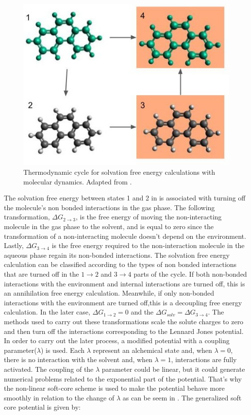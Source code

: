 	\begin{figure}[th]
		\centering
		\includegraphics[scale=0.6]{Figures/cicclotermo.jpg}
		\caption{Thermodynamic cycle for solvation free energy calculations with molecular dynamics. Adapted from .}
		\label{thermcy}
	\end{figure}
	
	The solvation free energy between states 1 and 2 in  is associated with turning off the molecule's non bonded interactions in the gas phase. The following transformation, $\Delta G_{2 \rightarrow 3}$, is the free energy of moving the non-interacting molecule in the gas phase to the solvent, and is equal to zero since the transformation of a non-interacting molecule doesn't depend on the environment. Lastly, $\Delta G_{3 \rightarrow 4}$ is the free energy required to the non-interaction molecule in the aqueous phase regain its non-bonded interactions.  The solvation free energy calculation can be classified according to the types of non bonded interactions that are turned off in the $1 \rightarrow 2$ and $ 3 \rightarrow 4$ parts of the cycle. If both non-bonded interactions with the environment and internal interactions are turned off, this is an annihilation free energy calculation. Meanwhile, if only non-bonded interactions with the environment are turned off,this is a decoupling free energy calculation. In the later case, $\Delta G_{1 \rightarrow 2} = 0$ and the $\Delta G_{solv} = \Delta G_{3 \rightarrow 4} $. The methods used to carry out these transformations scale the solute charges to zero and then turn off the interactions corresponding to the Lennard Jones potential. In order to carry out the later process, a modified potential with a coupling parameter($\lambda$) is used. Each $\lambda$ represent an alchemical state and, when $\lambda=0$, there is no interaction with the solvent and, when $\lambda=1$, interactions are fully activated. The coupling of the $\lambda$ parameter could be linear, but it could generate numerical problems related to the exponential part of the potential.  That's why the non-linear soft-core scheme \cite{beutler1994} is used to make the potential behave more smoothly in relation to the change of $\lambda$ as can be seem in . The generalized soft core potential is given by:
	
